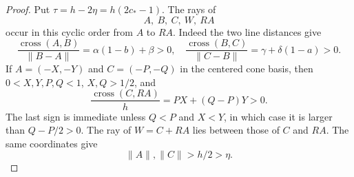 \begin{proof}

Put $\tau=h-2\eta=h(2c_*-1)$.  The rays of
\begin{equation}
 A,\ B,\ C,\ W,\ RA                              \label{eq:cap-ray-order}
\end{equation}
occur in this cyclic order from $A$ to $RA$.  Indeed the two line distances
give
\[
 \frac{\operatorname{cross}(A,B)}{\lVert B-A\rVert}
 =\alpha(1-b)+\beta>0,
 \quad
 \frac{\operatorname{cross}(B,C)}{\lVert C-B\rVert}
 =\gamma+\delta(1-a)>0.
\]
If $A=(-X,-Y)$ and $C=(-P,-Q)$ in the centered cone basis, then
$0<X,Y,P,Q<1$, $X,Q>1/2$, and
\[
 \frac{\operatorname{cross}(C,RA)}h=PX+(Q-P)Y>0.
\]
The last sign is immediate unless $Q<P$ and $X<Y$, in which case it is
larger than $Q-P/2>0$.  The ray of $W=C+RA$ lies between those of $C$ and
$RA$.  The same coordinates give
\begin{equation}
 \lVert A\rVert,\lVert C\rVert>h/2>\eta.         \label{eq:outer-radii}
\end{equation}


\end{proof}
